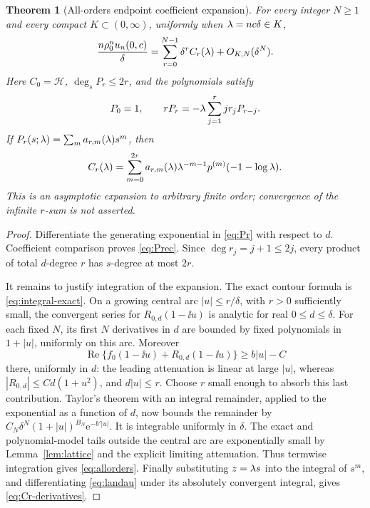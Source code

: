\documentclass[11pt,a4paper]{article}
\numberwithin{equation}{section}
\newtheorem{theorem}{Theorem}[section]
\theoremstyle{definition}
\theoremstyle{remark}
\DeclareMathOperator{\Rea}{Re}
\newcommand{\rhob}{\rho_0}\newcommand{\ee}{\mathrm e}
\newcommand{\HH}{\mathcal H}\newcommand{\RR}{\mathcal R}
\begin{document}
\begin{theorem}[All-orders endpoint coefficient expansion]
\label{thm:allorders}
For every integer \(N\ge1\) and every compact
\(K\subset(0,\infty)\), uniformly when \(\lambda=nc\delta\in K\),
\begin{equation}\label{eq:allorders}
 \frac{n\rhob^n u_n(0,c)}\delta
   =\sum_{r=0}^{N-1}\delta^r C_r(\la)+O_{K,N}(\delta^N).
\end{equation}
Here \(C_0=\HH\), \(\deg_s P_r\le2r\), and the polynomials satisfy
\begin{equation}\label{eq:Prec}
 P_0=1,\qquad
 rP_r=-\lambda\sum_{j=1}^r j r_j P_{r-j}.
\end{equation}
If \(P_r(s;\lambda)=\sum_m a_{r,m}(\lambda)s^m\), then
\begin{equation}\label{eq:Cr-derivatives}
 C_r(\lambda)=\sum_{m=0}^{2r}a_{r,m}(\lambda)\lambda^{-m-1}
                p^{(m)}(-1-\log\lambda).
\end{equation}
This is an asymptotic expansion to arbitrary finite order; convergence
of the infinite \(r\)-sum is not asserted.
\end{theorem}
\begin{proof}
Differentiate the generating exponential in \eqref{eq:Pr} with respect
to \(d\). Coefficient comparison proves \eqref{eq:Prec}.
Since \(\deg r_j=j+1\le2j\), every product of total \(d\)-degree \(r\)
has \(s\)-degree at most \(2r\).

It remains to justify integration of the expansion. The exact contour
formula is \eqref{eq:integral-exact}. On a growing central arc
\(|u|\le r/\delta\), with \(r>0\) sufficiently small, the convergent
series for \(R_{0,d}(1-\ii u)\) is analytic for real
\(0\le d\le\delta\). For each fixed \(N\), its first \(N\) derivatives
in \(d\) are bounded by fixed polynomials in \(1+|u|\), uniformly on
this arc. Moreover
\[
 \Rea\{f_0(1-\ii u)+R_{0,d}(1-\ii u)\}
       \ge b|u|-C
\]
there, uniformly in \(d\): the leading attenuation is linear at large
\(|u|\), whereas \(|R_{0,d}|\le Cd(1+u^2)\), and \(d|u|\le r\).
Choose \(r\) small enough to absorb this last contribution.
Taylor's theorem with an integral remainder, applied to the exponential
as a function of \(d\), now bounds the remainder by
\(C_N\delta^N(1+|u|)^{B_N}\ee^{-b'|u|}\).
It is integrable uniformly in \(\delta\). The exact and polynomial-model
tails outside the central arc are exponentially small by
Lemma~\ref{lem:lattice} and the explicit limiting attenuation. Thus
termwise integration gives \eqref{eq:allorders}.
Finally substituting \(z=\lambda s\) into the integral of \(s^m\), and
differentiating \eqref{eq:landau} under its absolutely convergent
integral, gives \eqref{eq:Cr-derivatives}.
\end{proof}
\end{document}
